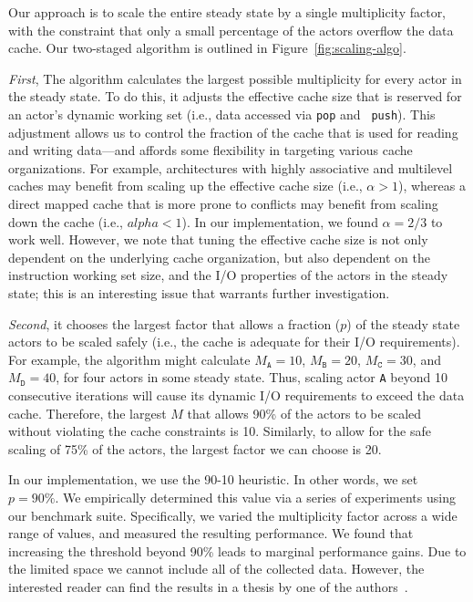 Our approach is to scale the entire steady state by a single
multiplicity factor, with the constraint that only a small percentage
of the actors overflow the data cache. Our two-staged algorithm is
outlined in Figure~\ref{fig:scaling-algo}.

{\it First}, The algorithm calculates the largest
possible multiplicity  
for every actor in the steady state. To do this, it
adjusts the effective cache size that is reserved for an actor's
dynamic working set (i.e., data accessed via {\tt pop} and {\tt
push}). This adjustment allows us to control the fraction of the cache
that is used for reading and writing data---and affords some
flexibility in targeting various cache organizations.  For example,
architectures with highly associative and multilevel caches may benefit
from scaling up the effective cache size (i.e., $\alpha > 1$), whereas
a direct mapped cache that is more prone to conflicts may benefit from
scaling down the cache (i.e., $alpha < 1$). In our implementation, we
found $\alpha=2/3$ to work well. However, we note that tuning the
effective cache size is not only dependent on the underlying cache
organization, but also dependent on the instruction  working
set size, and the  I/O properties of the actors in the steady
state; this is an interesting issue that warrants further
investigation.

{\it Second}, it chooses the largest
factor that allows a fraction ($p$) of the steady state actors to be
scaled safely (i.e., the cache is adequate for their I/O
requirements).  For example, the algorithm might calculate
$M_\texttt{A} = 10$,
$M_\texttt{B} = 20$, 
$M_\texttt{C} = 30$, and 
$M_\texttt{D} = 40$, for four actors in some steady state. Thus,
scaling actor \texttt{A} beyond 10 consecutive iterations will cause
its dynamic I/O requirements to exceed the data cache. Therefore, the
largest $M$ that allows 90\% of the actors to be
scaled without violating the cache constraints is 10.
Similarly, to allow for the safe scaling of 75\% of the actors, the
largest factor we can choose is 20.

In our implementation, we use the 90-10 heuristic. In other words, we
set $p=90\%$. We empirically determined this value via a series of
experiments using our benchmark suite. Specifically, we varied the
multiplicity factor across a wide range of values,
and measured the resulting performance. We found that
increasing the threshold beyond 90\% leads to marginal
performance gains. Due to the limited space we cannot include all of
the collected data. However, the interested reader can find
the results in a thesis by one of the authors~\cite{janis-thesis}.
